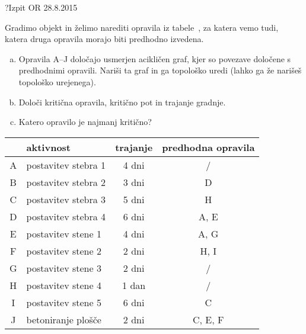 \begin{naloga}{?}{Izpit OR 28.8.2015}
\begin{vprasanje}
Gradimo objekt in želimo narediti opravila iz tabele~\tab{},
za katera vemo tudi, katera druga opravila morajo biti predhodno izvedena.
\begin{enumerate}[(a)]
\item Opravila A--J določajo usmerjen acikličen graf,
kjer so povezave določene s predhodnimi opravili.
Nariši ta graf in ga topološko uredi
(lahko ga že narišeš topološko urejenega).

\item Določi kritična opravila, kritično pot in trajanje gradnje.

\item Katero opravilo je najmanj kritično?
\end{enumerate}

\begin{tabela}
\begin{tabular}{c|l|c|c}
& aktivnost & trajanje & predhodna opravila \\
\hline
A & postavitev stebra 1 & 4 dni & / \\
B & postavitev stebra 2 & 3 dni & D \\
C & postavitev stebra 3 & 5 dni & H \\
D & postavitev stebra 4 & 6 dni & A, E \\
E & postavitev stene 1  & 4 dni & A, G \\
F & postavitev stene 2  & 2 dni & H, I \\
G & postavitev stene 3  & 2 dni & / \\
H & postavitev stene 4  & 1 dan & / \\
I & postavitev stene 5  & 6 dni & C \\
J & betoniranje plošče  & 2 dni & C, E, F \\
\end{tabular}
\end{tabela}
\end{vprasanje}
\begin{odgovor}
\end{odgovor}
\end{naloga}
